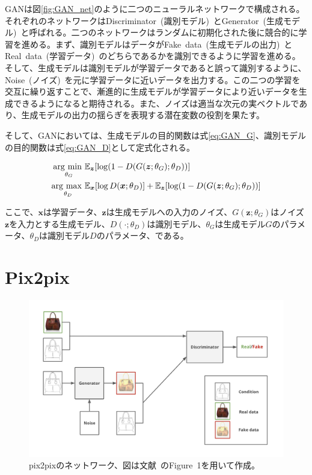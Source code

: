 GANは図\ref{fig:GAN_net}のように二つのニューラルネットワークで構成される。それぞれのネットワークはDiscriminator~(識別モデル)~とGenerator~(生成モデル)~と呼ばれる。二つのネットワークはランダムに初期化された後に競合的に学習を進める。まず、識別モデルはデータがFake~data~(生成モデルの出力)~とReal~data~(学習データ)~のどちらであるかを識別できるように学習を進める。そして、生成モデルは識別モデルが学習データであると誤って識別するように、Noise~(ノイズ)~を元に学習データに近いデータを出力する。この二つの学習を交互に繰り返すことで、漸進的に生成モデルが学習データにより近いデータを生成できるようになると期待される。また、ノイズは適当な次元の実ベクトルであり、生成モデルの出力の揺らぎを表現する潜在変数の役割を果たす。

そして、GANにおいては、生成モデルの目的関数は式\ref{eq:GAN_G}、識別モデルの目的関数は式\ref{eq:GAN_D}として定式化される。

\begin{align}
    \label{eq:GAN_G}
    \mathop{\rm arg~min~}\limits _{\theta_G}& \mathbb{E}_{\boldsymbol{z}}[\log (1-D(G(\boldsymbol{z};\theta_G);\theta_D))]\\
    \label{eq:GAN_D}
    \mathop{\rm arg~max~}\limits _{\theta_D}& \mathbb{E}_{\boldsymbol{x}}[\log D(\boldsymbol{x};\theta_D)]+\mathbb{E}_{\boldsymbol{z}}[\log (1-D(G(\boldsymbol{z};\theta_G);\theta_D))]
\end{align}


ここで、$\boldsymbol{x}$は学習データ、$\boldsymbol{z}$は生成モデルへの入力のノイズ、$G(\boldsymbol{z};\theta_G)$はノイズ$\boldsymbol{z}$を入力とする生成モデル、$D(\cdot;\theta_D)$は識別モデル、$\theta_G$は生成モデル$G$のパラメータ、$\theta_D$は識別モデル$D$のパラメータ、である。

\section{Pix2pix}

\begin{figure}[t]
\begin{center}
\includegraphics[width=\hsize]{figure/pix2pix_net.png}
\caption{pix2pixのネットワーク、図は文献~\cite{pix2pix}のFigure~1を用いて作成。}
\label{fig:pix2pix_net}
\end{center}
\end{figure}

